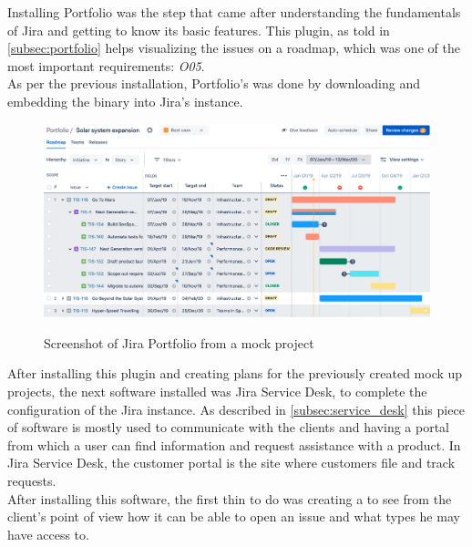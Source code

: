 	Installing Portfolio was the step that came after understanding the fundamentals of Jira and getting to know its basic features.
	This plugin, as told in \ref{subsec:portfolio} helps visualizing the issues on a roadmap, which was one of the most important requirements: \textit{O05}.\\
	As per the previous installation, Portfolio's was done by downloading and embedding the binary into Jira's instance.
	\begin{figure}[H]
		\centering
		\includegraphics[width=\textwidth]{resources/portfolio}\\
		\caption{Screenshot of Jira Portfolio from a mock project}
	\end{figure}
	After installing this plugin and creating plans for the previously created mock up projects, the next software installed was Jira Service Desk, to complete the configuration of the Jira instance.
	As described in \ref{subsec:service_desk} this piece of software is mostly used to communicate with the clients and having a portal from which a user can find information and request assistance with a product.
	In Jira Service Desk, the customer portal is the site where customers file and track requests.\\
	After installing this software, the first thin to do was creating a  to see from the client's point of view how it can be able to open an issue and what types he may have access to.
